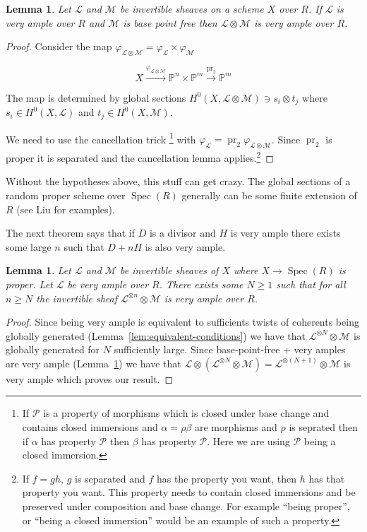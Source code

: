 \documentclass[12pt]{article}
\numberwithin{equation}{section}
\newtheorem{lemma}[theorem]{Lemma}
\theoremstyle{definition}
\theoremstyle{remark}
\newcommand{\PP}{\mathbb{P}}
\newcommand{\Spec}{\operatorname{Spec}}
\newcommand{\Lcal}{\mathcal{L}}
\newcommand{\Mcal}{\mathcal{M}}
\newcommand{\Pcal}{\mathcal{P}}
\newcommand{\pr}{\operatorname{pr}}
\begin{document}
\begin{lemma}\label{lem:glob-gen+very-ample}
	Let $\Lcal$ and $\Mcal$ be invertible sheaves on a scheme $X$ over $R$. 
	If $\Lcal$ is very ample over $R$ and $\Mcal$ is base point free then $\Lcal\otimes \Mcal$ is very ample over $R$.
\end{lemma}
\begin{proof}
	Consider the map $\varphi_{\Lcal\otimes \Mcal} = \varphi_{\Lcal}\times \varphi_{\Mcal}$
	
	$$ X \xrightarrow{\varphi_{\Lcal\otimes\Mcal}} \PP^n \times \PP^m \xrightarrow{\pr_2} \PP^m $$
	
	The map is determined by global sections $H^0(X,\Lcal\otimes \Mcal) \owns s_i\otimes t_j$ where $s_i \in H^0(X,\Lcal)$ and $t_j \in H^0(X,\Mcal)$. 
	
	We need to use the cancellation trick \footnote{
		If $\Pcal$ is a property of morphisms which is closed under base change and contains closed immersions and $\alpha = \rho \beta$ are morphisms and $\rho$ is seprated then if $\alpha$ has property $\Pcal$ then $\beta$ has property $\Pcal$. 
		Here we are using $\Pcal$ being a closed immersion.
	} 
with $\varphi_{\Lcal} = \pr_2\varphi_{\Lcal\otimes \Mcal}$. 
	Since $\pr_2$ is proper it is separated and the cancellation lemma applies.\footnote{
		If $f=gh$, $g$ is separated and $f$ has the property you want, then $h$ has that property you want. This property needs to contain closed immersions and be preserved under composition and base change. 
		For example ``being proper'', or ``being a closed immersion'' would be an example of such a property.
	}
	
\end{proof}
Without the hypotheses above, this stuff can get crazy.
The global sections of a random proper scheme over $\Spec(R)$ generally can be some finite extension of $R$ (see Liu for examples).

The next theorem says that if $D$ is a divisor and $H$ is very ample there exists some large $n$ such that $D+nH$ is also very ample.
\begin{lemma}\label{thm:adding-multiple-of-very-ample}
	Let $\Lcal$ and $\Mcal$ be invertible sheaves of $X$ where $X \to \Spec(R)$ is proper. 
	Let $\Lcal$ be very ample over $R$. 
	There exists some $N\geq 1$ such that for all $n\geq N$ the invertible sheaf $\Lcal^{\otimes n} \otimes \Mcal$ is very ample over $R$.
\end{lemma}
\begin{proof}
	Since being very ample is equivalent to sufficients twists of coherents being globally generated (Lemma~\ref{lem:equivalent-conditions}) we have that $\Lcal^{\otimes N} \otimes \Mcal$ is globally generated for $N$ sufficiently large. 
	Since base-point-free + very amples are very ample (Lemma~\ref{lem:glob-gen+very-ample}) we have that $\Lcal \otimes (\Lcal^{\otimes N} \otimes \Mcal) =\Lcal^{\otimes(N+1)}\otimes \Mcal$ is very ample which proves our result. 
\end{proof}
\end{document}
